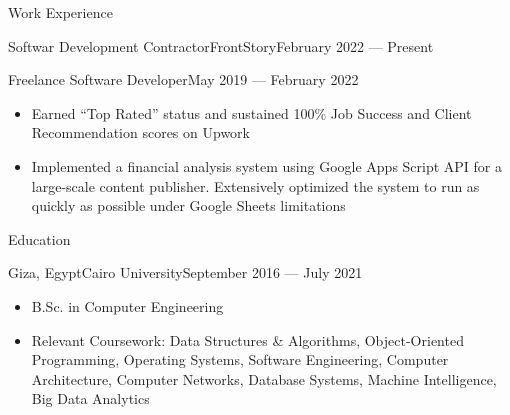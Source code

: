 \documentclass[]{mcdowellcv}
\begin{document}
	\makeheader
	
	
	\begin{cvsection}{Work Experience}
		\begin{cvsubsection}{Softwar Development Contractor}{FrontStory}{February 2022 — Present}
		\end{cvsubsection}
		\begin{cvsubsection}{Freelance Software Developer}{}{May 2019 — February 2022}
			\begin{itemize}
				\item Earned “Top Rated” status and sustained 100\% Job Success and Client Recommendation scores on Upwork
				\item Implemented a financial analysis system using Google Apps Script API for a large-scale content publisher. Extensively optimized the system to run as quickly as possible under Google Sheets limitations
			\end{itemize}
		\end{cvsubsection}
	\end{cvsection}
	
	\begin{cvsection}{Education}
		\begin{cvsubsection}{Giza, Egypt}{Cairo University}{September 2016 — July 2021}
			\begin{itemize}
				\item B.Sc. in Computer Engineering
				\item Relevant Coursework: Data Structures \& Algorithms, Object-Oriented Programming, Operating Systems, Software Engineering, Computer Architecture, Computer Networks, Database Systems, Machine Intelligence, Big Data Analytics
			\end{itemize}
		\end{cvsubsection}
	\end{cvsection}
	
\end{document}
